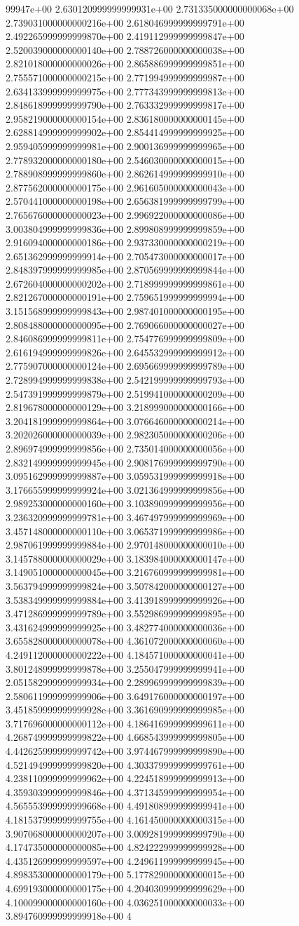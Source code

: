99947e+00	2.630120999999999931e+00	2.731335000000000068e+00	2.739031000000000216e+00	2.618046999999999791e+00	2.492265999999999870e+00	2.419112999999999847e+00	2.520039000000000140e+00	2.788726000000000038e+00	2.821018000000000026e+00	2.865886999999999851e+00	2.755571000000000215e+00	2.771994999999999987e+00	2.634133999999999975e+00	2.777343999999999813e+00	2.848618999999999790e+00	2.763332999999999817e+00	2.958219000000000154e+00	2.836180000000000145e+00	2.628814999999999902e+00	2.854414999999999925e+00	2.959405999999999981e+00	2.900136999999999965e+00	2.778932000000000180e+00	2.546030000000000015e+00	2.788908999999999860e+00	2.862614999999999910e+00	2.877562000000000175e+00	2.961605000000000043e+00	2.570441000000000198e+00	2.656381999999999799e+00	2.765676000000000023e+00	2.996922000000000086e+00	3.003804999999999836e+00	2.899808999999999859e+00	2.916094000000000186e+00	2.937330000000000219e+00	2.651362999999999914e+00	2.705473000000000017e+00	2.848397999999999985e+00	2.870569999999999844e+00	2.672604000000000202e+00	2.718999999999999861e+00	2.821267000000000191e+00	2.759651999999999994e+00	3.151568999999999843e+00	2.987401000000000195e+00	2.808488000000000095e+00	2.769066000000000027e+00	2.846086999999999811e+00	2.754776999999999809e+00	2.616194999999999826e+00	2.645532999999999912e+00	2.775907000000000124e+00	2.695669999999999789e+00	2.728994999999999838e+00	2.542199999999999793e+00	2.547391999999999879e+00	2.519941000000000209e+00	2.819678000000000129e+00	3.218999000000000166e+00	3.204181999999999864e+00	3.076646000000000214e+00	3.202026000000000039e+00	2.982305000000000206e+00	2.896974999999999856e+00	2.735014000000000056e+00	2.832149999999999945e+00	2.908176999999999790e+00	3.095162999999999887e+00	3.059531999999999918e+00	3.176655999999999924e+00	3.021364999999999856e+00	2.989253000000000160e+00	3.103890999999999956e+00	3.236320999999999781e+00	3.467497999999999969e+00	3.457148000000000110e+00	3.065371999999999986e+00	2.987061999999999884e+00	2.970148000000000010e+00	3.145788000000000029e+00	3.183984000000000147e+00	3.149051000000000045e+00	3.216760999999999981e+00	3.563794999999999824e+00	3.507842000000000127e+00	3.538349999999999884e+00	3.413918999999999926e+00	3.471286999999999789e+00	3.552986999999999895e+00	3.431624999999999925e+00	3.482774000000000036e+00	3.655828000000000078e+00	4.361072000000000060e+00	4.249112000000000222e+00	4.184571000000000041e+00	3.801248999999999878e+00	3.255047999999999941e+00	2.051582999999999934e+00	2.289969999999999839e+00	2.580611999999999906e+00	3.649176000000000197e+00	3.451859999999999928e+00	3.361690999999999985e+00	3.717696000000000112e+00	4.186416999999999611e+00	4.268749999999999822e+00	4.668543999999999805e+00	4.442625999999999742e+00	3.974467999999999890e+00	4.521494999999999820e+00	4.303379999999999761e+00	4.238110999999999962e+00	4.224518999999999913e+00	4.359303999999999846e+00	4.371345999999999954e+00	4.565553999999999668e+00	4.491808999999999941e+00	4.181537999999999755e+00	4.161450000000000315e+00	3.907068000000000207e+00	3.009281999999999790e+00	4.174735000000000085e+00	4.824222999999999928e+00	4.435126999999999597e+00	4.249611999999999945e+00	4.898353000000000179e+00	5.177829000000000015e+00	4.699193000000000175e+00	4.204030999999999629e+00	4.100099000000000160e+00	4.036251000000000033e+00	3.894760999999999918e+00	4